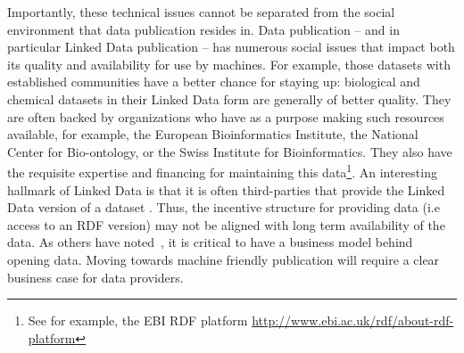 Importantly, these technical issues cannot be separated from
 the social environment that data publication resides in.
Data publication -- and in particular Linked Data publication --
 has numerous social issues that impact both its quality
 and availability for use by machines.
For example, those datasets with established communities
 have a better chance for staying up:
 biological and chemical datasets in their Linked Data form
 are generally of better quality.
They are often backed by organizations who have as a purpose
 making such resources available, for example,
 the European Bioinformatics Institute,
 the National Center for Bio-ontology,
 or the Swiss Institute for Bioinformatics.
They also have the requisite expertise and financing for
 maintaining this data\footnote{See for example,
   the EBI RDF platform \url{http://www.ebi.ac.uk/rdf/about-rdf-platform}}.
An interesting hallmark of Linked Data is that it is often third-parties
 that provide the Linked Data version of a dataset \cite{Heath2011}.
Thus, the incentive structure for providing data
 (i.e access to an RDF version) may not be aligned with
 long term availability of the data.
As others have noted~\cite{bismodelslogd},
 it is critical to have a business model behind opening data.
Moving towards machine friendly publication will require
 a clear business case for data providers.


